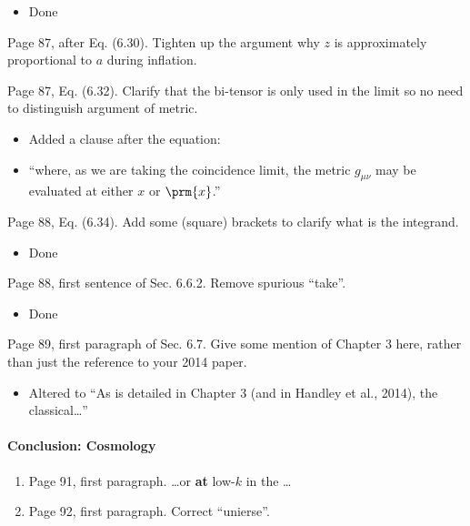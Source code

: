 \documentclass[11pt]{article}
\newcommand{\todo}[1]{{\color{red} #1}}
\begin{document}
\begin{enumerate}
    \begin{itemize}
        \item Done
    \end{itemize}
    \todo{%
\item Page 87, after Eq. (6.30). Tighten up the argument why $z$ is
  approximately proportional to $a$ during inflation.
  }
\item Page 87, Eq. (6.32). Clarify that the bi-tensor is only used in
  the limit so no need to distinguish argument of metric.
  \begin{itemize}
      \item Added a clause after the equation:
        \item ``where, as we are taking the coincidence limit, the metric \(g_{\mu\nu}\) may be evaluated at either \(x\) or \(\prm{x}\).''
  \end{itemize}
\item Page 88, Eq. (6.34). Add some (square) brackets to clarify what
  is the integrand.
  \begin{itemize}
      \item Done
  \end{itemize}
\item Page 88,  first sentence of Sec. 6.6.2. Remove spurious
  ``take''.
  \begin{itemize}
      \item Done
  \end{itemize}
\item Page 89, first paragraph of Sec. 6.7. Give some mention of
  Chapter 3 here, rather than just the reference to your 2014 paper. 
  \begin{itemize}
      \item Altered to ``As is detailed in Chapter 3 (and in Handley et al., 2014), the classical\ldots''
  \end{itemize}
\end{enumerate}

\paragraph{Conclusion: Cosmology}
\begin{enumerate}
\item Page 91, first paragraph. \ldots or \textbf{at} low-$k$ in the
  \ldots
\item Page 92, first paragraph. Correct ``unierse''.
\end{enumerate}
\end{document}
